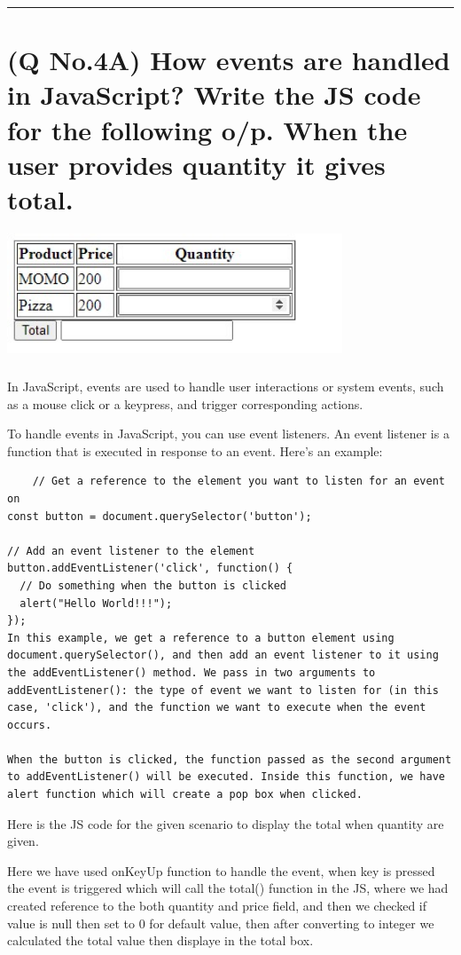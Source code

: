 \documentclass[11pt]{article}
\begin{document}



\noindent\rule{\linewidth}{0.4pt}
\section{(Q No.4A) How events are handled in JavaScript? Write the JS code for the following o/p. When the user provides quantity it gives total.}
\includegraphics[width=0.75\textwidth]{resources/qno4a.jpg}
\subparagraph{}
In JavaScript, events are used to handle user interactions or system events, such as a mouse click or a keypress, and trigger corresponding actions.

To handle events in JavaScript, you can use event listeners. An event listener is a function that is executed in response to an event. Here's an example:
\begin{lstlisting}
    // Get a reference to the element you want to listen for an event on
const button = document.querySelector('button');

// Add an event listener to the element
button.addEventListener('click', function() {
  // Do something when the button is clicked
  alert("Hello World!!!");
});
In this example, we get a reference to a button element using document.querySelector(), and then add an event listener to it using the addEventListener() method. We pass in two arguments to addEventListener(): the type of event we want to listen for (in this case, 'click'), and the function we want to execute when the event occurs.

When the button is clicked, the function passed as the second argument to addEventListener() will be executed. Inside this function, we have alert function which will create a pop box when clicked.
\end{lstlisting}

Here is the JS code for the given scenario to display the total when quantity are given.


Here we have used onKeyUp function to handle the event, when key is pressed the event is triggered which will call the total() function in the JS, where we had created reference to the both quantity and price field, and then we checked if value is null then set to 0 for default value, then after converting to integer we calculated the total value then displaye in the total box.
\end{document}

